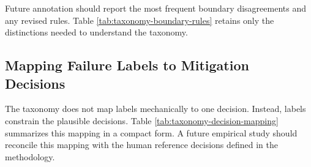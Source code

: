 \documentclass[10pt]{article}
\begin{document}
Future annotation should report the most frequent boundary disagreements and any revised rules. Table \ref{tab:taxonomy-boundary-rules} retains only the distinctions needed to understand the taxonomy.

\subsection{Mapping Failure Labels to Mitigation Decisions}

The taxonomy does not map labels mechanically to one decision. Instead, labels constrain the plausible decisions. Table \ref{tab:taxonomy-decision-mapping} summarizes this mapping in a compact form. A future empirical study should reconcile this mapping with the human reference decisions defined in the methodology.

\begingroup
\footnotesize
\renewcommand{\arraystretch}{1.18}
\end{document}
